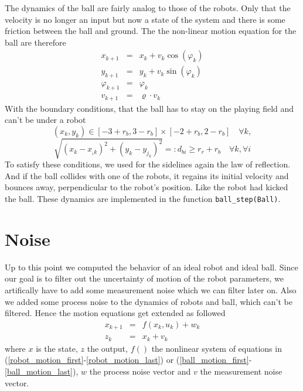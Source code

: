 %
The dynamics of the ball are fairly analog to those of the robots. Only that the velocity is no longer an input but now a state of the system and there is some friction between the ball and ground. 
The the non-linear motion equation for the ball are therefore
\begin{eqnarray}
	x_{{k+1}} &=& x_{k} + v_{k} \cos(\varphi_{k}) 	\label{ball_motion_first} \\
	y_{{k+1}} &=& y_{k} + v_{k} \sin(\varphi_{k}) \\
	\varphi_{{k+1}} &=& \varphi_{k}\\
	v_{{k+1}} &=& \varrho \cdot v_{k}
	\label{ball_motion_last}
\end{eqnarray}
With the boundary conditions, that the ball has to stay on the playing field and can't be under a robot
	\[ (x_{k},y_{k}) \in [-3+r_b,3-r_b]\times[-2+r_b,2-r_b] \quad \forall k, 
	\]
	\[ \sqrt{(x_{k}-x_{_i{k}})^2 + (y_{k}-y_{j_{k}})^2} =: d_{bi} \geq r_r + r_b \quad \forall k, \forall i
	\]
To satisfy these conditions, we used for the sidelines again the law of reflection.  And if the ball collides with one of the robots, it regains its initial velocity and bounces away, perpendicular to the robot's position. Like the robot had kicked the ball. These dynamics are implemented in the function \texttt{ball\_step(Ball)}.

\section{Noise}
Up to this point we computed the behavior of an ideal robot and ideal ball. Since our goal is to filter out the uncertainty of motion of the robot parameters, we artifically have to add some measurement noise which we can filter later on. %
Also we added some process noise to the dynamics of robots and ball, which can't be filtered.
Hence the motion equations get extended as followed
\begin{eqnarray*}
	x_{k+1} &=& {f}({x}_k,{u}_k) + {w}_k \\
	{z}_{k} &=& {x}_k + v_k
\end{eqnarray*}
where $x$ is the state, $z$ the output, $f()$ the nonlinear system of equations in (\ref{robot_motion_first}-\ref{robot_motion_last}) or (\ref{ball_motion_first}-\ref{ball_motion_last}), $w$ the process noise vector and $v$ the measurement noise vector.\\

